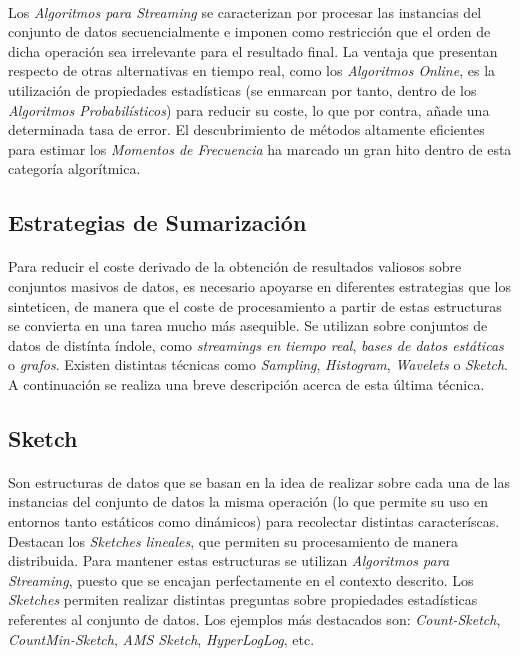 \documentclass{subfiles}
\begin{document}
        \paragraph{}
        Los \emph{Algoritmos para Streaming} se caracterizan por procesar las instancias del conjunto de datos secuencialmente e imponen como restricción que el orden de dicha operación sea irrelevante para el resultado final. La ventaja que presentan respecto de otras alternativas en tiempo real, como los \emph{Algoritmos Online}, es la utilización de propiedades estadísticas (se enmarcan por tanto, dentro de los \emph{Algoritmos Probabilísticos}) para reducir su coste, lo que por contra, añade una determinada tasa de error. El descubrimiento de métodos altamente eficientes para estimar los \emph{Momentos de Frecuencia} ha marcado un gran hito dentro de esta categoría algorítmica.

      \subsection{Estrategias de Sumarización}

        \paragraph{}
        Para reducir el coste derivado de la obtención de resultados valiosos sobre conjuntos masivos de datos, es necesario apoyarse en diferentes estrategias que los sinteticen, de manera que el coste de procesamiento a partir de estas estructuras se convierta en una tarea mucho más asequible. Se utilizan sobre conjuntos de datos de distínta índole, como \emph{streamings en tiempo real}, \emph{bases de datos estáticas} o \emph{grafos}. Existen distintas técnicas como \emph{Sampling}, \emph{Histogram}, \emph{Wavelets} o \emph{Sketch}. A continuación se realiza una breve descripción acerca de esta última técnica.

        \subsection{Sketch}

          \paragraph{}
          Son estructuras de datos que se basan en la idea de realizar sobre cada una de las instancias del conjunto de datos la misma operación (lo que permite su uso en entornos tanto estáticos como dinámicos) para recolectar distintas caracteríscas. Destacan los \emph{Sketches lineales}, que permiten su procesamiento de manera distribuida. Para mantener estas estructuras se utilizan \emph{Algoritmos para Streaming}, puesto que se encajan perfectamente en el contexto descrito. Los \emph{Sketches} permiten realizar distintas preguntas sobre propiedades estadísticas referentes al conjunto de datos. Los ejemplos más destacados son: \emph{Count-Sketch}, \emph{CountMin-Sketch}, \emph{AMS Sketch}, \emph{HyperLogLog}, etc.
\end{document}
